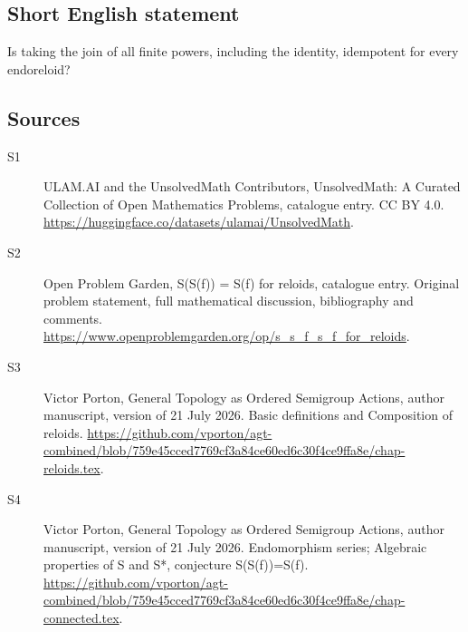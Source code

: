 \documentclass[11pt]{article}
\begin{document}
\subsection{Short English statement}
Is taking the join of all finite powers, including the identity, idempotent for every endoreloid?
\subsection{Sources}
\begin{description}
\item[\hypertarget{source:statement:1}{S1}] ULAM.AI and the UnsolvedMath Contributors, UnsolvedMath: A Curated Collection of Open Mathematics Problems, catalogue entry. CC BY 4.0. \url{https://huggingface.co/datasets/ulamai/UnsolvedMath}.
\item[\hypertarget{source:statement:2}{S2}] Open Problem Garden, S(S(f)) = S(f) for reloids, catalogue entry. Original problem statement, full mathematical discussion, bibliography and comments. \url{https://www.openproblemgarden.org/op/s_s_f_s_f_for_reloids}.
\item[\hypertarget{source:statement:3}{S3}] Victor Porton, General Topology as Ordered Semigroup Actions, author manuscript, version of 21 July 2026. Basic definitions and Composition of reloids. \url{https://github.com/vporton/agt-combined/blob/759e45cced7769cf3a84ce60ed6c30f4ce9ffa8e/chap-reloids.tex}.
\item[\hypertarget{source:statement:4}{S4}] Victor Porton, General Topology as Ordered Semigroup Actions, author manuscript, version of 21 July 2026. Endomorphism series; Algebraic properties of S and S*, conjecture S(S(f))=S(f). \url{https://github.com/vporton/agt-combined/blob/759e45cced7769cf3a84ce60ed6c30f4ce9ffa8e/chap-connected.tex}.
\end{description}
\label{end:statement}
\end{document}
